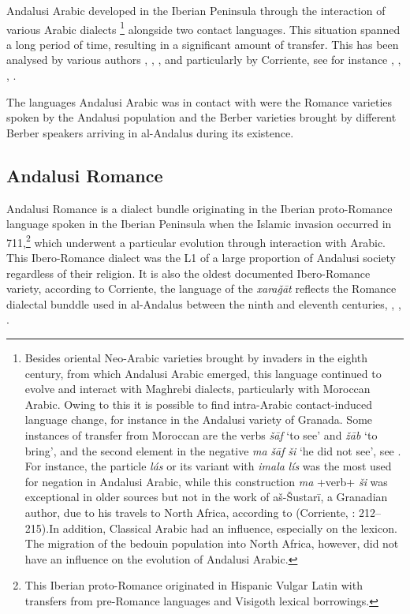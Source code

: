 \documentclass[output=paper,modfonts,nonflat]{langsci/langscibook}
\begin{document}
Andalusi Arabic developed in the Iberian Peninsula through the interaction of various Arabic dialects \footnote{Besides oriental Neo-Arabic varieties brought by invaders in the eighth century, from which Andalusi Arabic emerged, this language continued to evolve and interact with Maghrebi dialects, particularly with Moroccan Arabic. Owing to this it is possible to find intra-Arabic contact-induced language change, for instance in the Andalusi variety of Granada. Some instances of transfer from Moroccan are the verbs \textit{šāf} ‘to see’ and \textit{žāb} ‘to bring’, and the second element in the negative \textit{ma} \textit{šāf} \textit{ši} ‘he did not see’, see \citep[57]{Corriente1998a}. For instance, the particle \textit{lás} or its variant with \textit{imala} \textit{lís} was the most used for negation in Andalusi Arabic, while this construction \textit{ma} +verb+ \textit{ši} was exceptional {in older sources but not in the work of a}š-Šustarī, a Granadian{ author, due to his travels to North Africa, according to} (Corriente, \citealt{PereiraVicente2015}: 212–215){.}In addition, Classical Arabic had an influence, especially on the lexicon. The migration of the bedouin population into North Africa, however, did not have an influence on the evolution of Andalusi Arabic.} alongside two contact languages. This situation spanned a long period of time, resulting in a significant amount of transfer. This has been analysed by various authors \citep{Ferrando1995}, \citep{Ferrando1997}, \citep{Vicente2006}, and particularly by Corriente, see for instance \citep{Corriente1981}, \citep{Corriente1992}, \citep{Corriente2000}, \citep{Corriente2002}. 

The languages Andalusi Arabic was in contact with were the Romance varieties spoken by the Andalusi population and the Berber varieties brought by different Berber speakers arriving in al-Andalus during its existence. 



\subsection{Andalusi Romance}



Andalusi Romance is a dialect bundle originating in the Iberian proto-Romance language spoken in the Iberian Peninsula when the Islamic invasion occurred in 711,\footnote{This Iberian proto-Romance originated in Hispanic Vulgar Latin with transfers from pre-Romance languages and Visigoth lexical borrowings.}  which underwent a particular evolution through interaction with Arabic. This Ibero-Romance dialect was the L1 of a large proportion of Andalusi society regardless of their religion. It is also the oldest documented Ibero-Romance variety, according {to Corriente, the language of the \textit{xaraǧāt} reflects the Romance dialectal bunddle used in al-Andalus between the ninth and eleventh centuries,} {\citep{Corriente1995}}{,} {\citep{Corriente1997a}}{,} {\citep{Corriente2000}}{.} 
\end{document}
